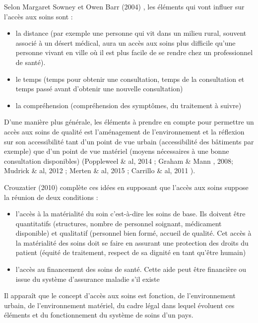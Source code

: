 Selon Margaret Sowney et Owen Barr (2004) \cite{SwoneyBarr2004}, les éléments qui vont influer sur l'accès aux soins sont : 
\begin{itemize}
\item la distance (par exemple une personne qui vit dans un milieu rural, souvent associé à un désert médical, aura un accès aux soins plus difficile qu'une personne vivant en ville où il est plus facile de se rendre chez un professionnel de santé).
\item le temps (temps pour obtenir une consultation, temps de la consultation et temps passé avant d'obtenir une nouvelle consultation)
\item la compréhension (compréhension des symptômes, du traitement à suivre)
\end{itemize}

D'une manière plus générale, les éléments à prendre en compte pour permettre un accès aux soins de qualité est l'aménagement de l'environnement et la réflexion sur son accessibilité tant d'un point de vue urbain (accessibilité des bâtiments par exemple) que d'un point de vue matériel (moyens nécessaires à une bonne consultation disponibles) (Poppleweel \& al, 2014 \cite{Popplewell2014}; Graham \& Mann \cite{GrahamMann2008}, 2008; Mudrick \& al, 2012 \cite{Mudrick2012}; Merten \& al, 2015 \cite{Merten2015}; Carrillo \& al, 2011 \cite{Carrillo2011}).

Crouzatier (2010) \cite{Crouzatier2010} complète ces idées en supposant que l'accès aux soins suppose la réunion de deux conditions : 
\begin{itemize}
\item l'accès à la matérialité du soin c'est-à-dire les soins de base. Ils doivent être quantitatifs (structures, nombre de personnel soignant, médicament disponible) et qualitatif (personnel bien formé, accueil de qualité. Cet accès à la matérialité des soins doit se faire en assurant une protection des droits du patient (équité de traitement, respect de sa dignité en tant qu'être humain)
\item l'accès au financement des soins de santé. Cette aide peut être financière ou issue du système d'assurance maladie s'il existe
\end{itemize}

Il apparaît que le concept d'accès aux soins est fonction, de l'environnement urbain, de l'environnement matériel, du cadre légal dans lequel évoluent ces éléments et du fonctionnement du système de soins d'un pays. 

